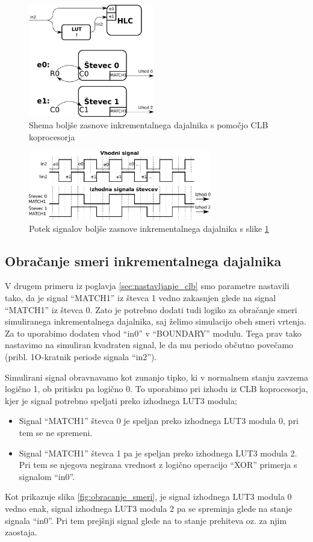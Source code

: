 \documentclass[a4paper]{article}
\begin{document}
\begin{sloppypar}
\begin{figure}[htb]
    \centerline{\includegraphics[width=5.5cm]{dobra_zasnova_shema}}
    \caption{Shema boljše zasnove inkrementalnega dajalnika s pomočjo CLB
             koprocesorja}
    \label{fig:dobra_zasnova_shema}
\end{figure}

\begin{figure}[htb]
    \centerline{\includegraphics[width=8cm]{dobra_zasnova_potek}}
    \caption{Potek signalov boljše zasnove inkrementalnega dajalnika s slike
             \ref{fig:dobra_zasnova_shema}}
    \label{fig:dobra_zasnova_potek}
\end{figure}

\subsection{Obračanje smeri inkrementalnega dajalnika}
V drugem primeru iz poglavja \ref{sec:nastavljanje_clb} smo parametre nastavili
tako, da je signal ``MATCH1'' iz števca 1 vedno zakasnjen glede na signal
``MATCH1'' iz števca 0. Zato je potrebno dodati tudi logiko za obračanje smeri
simuliranega inkrementalnega dajalnika, saj želimo simulacijo obeh smeri
vrtenja. Za to uporabimo dodaten vhod ``in0'' v ``BOUNDARY'' modulu. Tega prav
tako nastavimo na simuliran kvadraten signal, le da mu periodo občutno povečamo
(pribl. 1O-kratnik periode signala ``in2'').

Simulirani signal obravnavamo kot zunanjo tipko, ki v normalnem stanju zavzema
logično 1, ob pritisku pa logično 0. To uporabimo pri izhodu iz CLB
koprocesorja, kjer je signal potrebno speljati preko izhodnega LUT3 modula;
\begin{itemize}
    \item Signal ``MATCH1'' števca 0 je speljan preko izhodnega LUT3 modula 0,
        pri tem se ne spremeni.
    \item Signal ``MATCH1'' števca 1 pa je speljan preko izhodnega LUT3 modula
        2. Pri tem se njegova negirana vrednost z logično operacijo ``XOR''
        primerja s signalom ``in0''.
\end{itemize}
Kot prikazuje slika \ref{fig:obracanje_smeri}, je signal izhodnega LUT3 modula
0 vedno enak, signal izhodnega LUT3 modula 2 pa se spreminja glede na stanje
signala ``in0''. Pri tem prejšnji signal glede na to stanje prehiteva oz. za
njim zaostaja.


\end{sloppypar}
\end{document}
